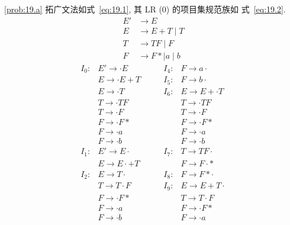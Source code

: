 \documentclass[boxes]{homework}
\begin{document}
\begin{solution}
    \ref{prob:19.a} 拓广文法如式~\ref{eq:19.1}, 其 LR (0) 的项目集规范族如
    式~\ref{eq:19.2}.
    \begin{equation}
        \label{eq:19.1}
        \begin{aligned}
            E' & \to E                 \\
            E  & \to E + T \mid T      \\
            T  & \to T F \mid F        \\
            F  & \to F * \mid a \mid b
        \end{aligned}
    \end{equation}
    \begin{equation}
        \label{eq:19.2}
        \begin{aligned}
            I_{0} : & E' \to \cdot E     & \qquad  I_{4} : & F  \to a \cdot     \\
                    & E  \to \cdot E + T & \qquad  I_{5} : & F  \to b \cdot     \\
                    & E  \to \cdot T     & \qquad  I_{6} : & E  \to E + \cdot T \\
                    & T  \to \cdot T F   & \qquad          & T  \to \cdot T F   \\
                    & T  \to \cdot F     & \qquad          & T  \to \cdot F     \\
                    & F  \to \cdot F *   & \qquad          & F  \to \cdot F *   \\
                    & F  \to \cdot a     & \qquad          & F  \to \cdot a     \\
                    & F  \to \cdot b     & \qquad          & F  \to \cdot b     \\
            I_{1} : & E' \to E \cdot     & \qquad  I_{7} : & T  \to T F \cdot   \\
                    & E  \to E \cdot + T & \qquad          & F  \to F \cdot *   \\
            I_{2} : & E  \to T \cdot     & \qquad  I_{8} : & F  \to F * \cdot   \\
                    & T  \to T \cdot F   & \qquad  I_{9} : & E  \to E + T \cdot \\
                    & F  \to \cdot F *   & \qquad          & T  \to T \cdot F   \\
                    & F  \to \cdot a     & \qquad          & F  \to \cdot F *   \\
                    & F  \to \cdot b     & \qquad          & F  \to \cdot a     \\

\end{aligned}
\end{equation}
\end{solution}
\end{document}
